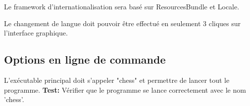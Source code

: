 \documentclass{article}
\begin{document}
\begin{nonfunctionnalneedbox}[F13: Internationalisation]
    Le framework d'internationalisation sera basé sur ResourcesBundle et Locale.
    \begin{subneedbox}
        Le changement de langue doit pouvoir être effectué en seulement 3 cliques
        sur l'interface graphique.
    \end{subneedbox}
\end{nonfunctionnalneedbox}

\subsection{Options en ligne de commande}

\begin{nonfunctionnalneedbox}
    L’exécutable principal doit s’appeler "chess" et permettre de lancer tout le programme.
    \textbf{Test:} Vérifier que le programme se lance correctement avec le nom 'chess'.
\end{nonfunctionnalneedbox}
\end{document}
